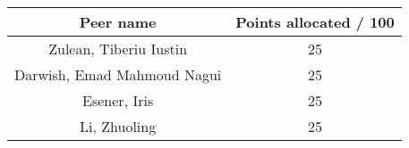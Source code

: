 \begin{center}
\begin{tabular}{ |c|c| } 
 \hline
 \textbf{Peer name} & \textbf{Points allocated / 100} \\
 \hline
 Zulean, Tiberiu Iustin & 25  \\ 
  \hline
 Darwish, Emad Mahmoud Nagui & 25  \\
  \hline
 Esener, Iris & 25  \\ 
  \hline
 Li, Zhuoling & 25  \\ 
 \hline
\end{tabular}
\end{center}